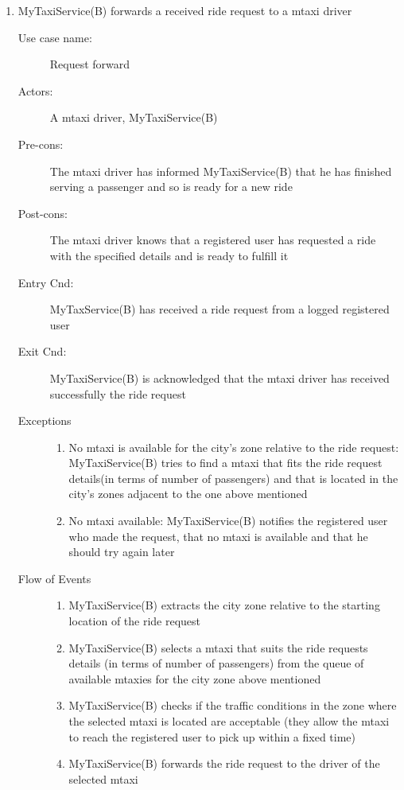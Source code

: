 \documentclass[11pt]{article} %
\begin{document}
\begin{enumerate}
	      \item  MyTaxiService(B) forwards a received ride request to a mtaxi driver
		\begin{description}
		        \item [Use case name:] Request forward
		        \item [Actors:] A mtaxi driver, MyTaxiService(B)
		        \item [Pre-cons:] The mtaxi driver has informed MyTaxiService(B) that he has finished serving a passenger and so is
		        ready for a new ride
		        \item [Post-cons:] The mtaxi driver knows that a registered user has requested a ride with the specified
		        details and is ready to fulfill it
		        \item [Entry Cnd:] MyTaxService(B) has received a ride request from a logged registered user
		        \item [Exit Cnd:] MyTaxiService(B) is acknowledged that the mtaxi driver has received successfully the ride request
		        \item [Exceptions]\hfill
			\begin{enumerate}
			          \item No mtaxi is available for the city's zone relative to the ride request: MyTaxiService(B) tries
			          to find a mtaxi that fits the ride request details(in terms of number of passengers) and that is located in the city's zones adjacent
			          to the one above mentioned
			          \item No mtaxi available: MyTaxiService(B) notifies the registered user who made the request, that
			          no mtaxi is available and that he should try again later
			\end{enumerate}
		        \item [Flow of Events]\hfill
			\begin{enumerate}
			          \item MyTaxiService(B) extracts the city zone relative to the starting location of the ride request
			          \item MyTaxiService(B) selects a mtaxi that suits the ride requests details (in terms of number of passengers) from the queue of available mtaxies
			            for the city zone above mentioned
			          \item MyTaxiService(B) checks if the traffic conditions in the zone where the selected mtaxi is located are acceptable
			          (they allow the mtaxi to reach the registered user to pick up within a fixed time)
			          \item MyTaxiService(B) forwards the ride request to the driver of the selected mtaxi
			\end{enumerate}
		\end{description}


\end{enumerate}
\end{document}
